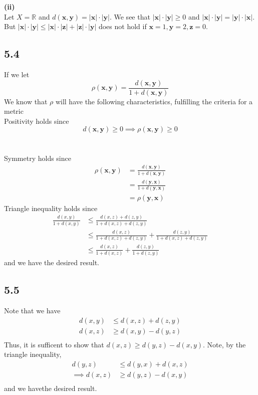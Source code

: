 \documentclass[letterpaper,12pt]{article}
\theoremstyle{definition}
\begin{document}
\textbf{(ii)}\\
Let $X = \mathbb{R}$ and $d(\textbf{x} ,\textbf{y}) = |\textbf{x}| \cdot |\textbf{y}|$. We see that $|\textbf{x}| \cdot |\textbf{y}| \geq 0$ and $|\textbf{x}| \cdot |\textbf{y}| = |\textbf{y}| \cdot |\textbf{x}|$. But $|\textbf{x}| \cdot |\textbf{y}| \leq |\textbf{x}| \cdot |\textbf{z}| + |\textbf{z}| \cdot |\textbf{y}|$ does not hold if $\textbf{x} = 1, \textbf{y} = 2, \textbf{z} = 0$. 

\subsection*{5.4}
If we let
\[ \rho (\textbf{x}, \textbf{y}) = \frac{d(\textbf{x}, \textbf{y})}{1 + d(\textbf{x}, \textbf{y})}  \]
We know that $\rho$ will have the following characteristics, fulfilling the criteria for a metric
\\
Positivity holds since \[d(\textbf{x}, \textbf{y}) \geq 0 \implies \rho (\textbf{x}, \textbf{y}) \geq 0\]\\
\\
Symmetry holds since
\begin{align*}
    \rho (\textbf{x}, \textbf{y}) &= \frac{d(\textbf{x}, \textbf{y})}{1 + d(\textbf{x}, \textbf{y})} \\
    &= \frac{d(\textbf{y}, \textbf{x})}{1 + d(\textbf{y}, \textbf{x})} \\
    &=  \rho (\textbf{y}, \textbf{x})
\end{align*}
Triangle inequality holds since
\begin{align*}
    \frac{d(x,y)}{1+d(x,y)}&\leq \frac{d(x,z)+d(z,y)}{1+d(x,z)+d(z,y)} \\
    & \leq \frac{d(x,z)}{1+d(x,z)+d(z,y)} + \frac{d(z,y)}{1+d(x,z)+d(z,y)} \\
    &  \leq \frac{d(x,z)}{1+d(x,z)} + \frac{d(z,y)}{1+d(z,y)}
\end{align*}
and we have the desired result.

\subsection*{5.5}


Note that we have
\begin{align*}
    d(x,y) & \leq d(x,z)+d(z,y) \\
    d(x,z)& \geq d(x,y)-d(y,z)\\
\end{align*}
Thus, it is sufficent to show that $d(x,z) \geq d(y,z) - d(x,y)$. Note, by the triangle inequality, 
\begin{align*}
    d(y,z) &\leq d(y,x) + d(x,z) \\
    \implies d(x,z) &\geq d(y,z) - d(x,y) \\
\end{align*}
and we havethe desired result.
\end{document}
